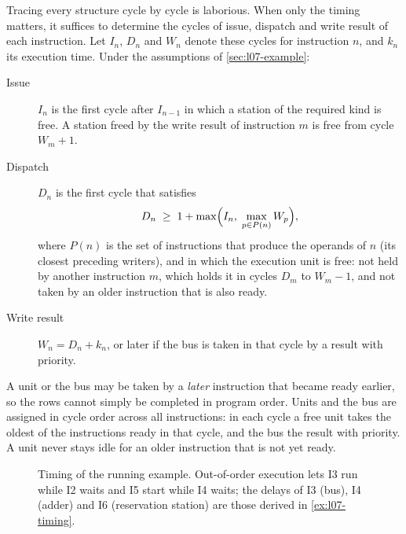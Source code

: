 \documentclass[../main.tex]{subfiles}
\begin{document}
Tracing every structure cycle by cycle is laborious.  When only the timing
matters, it suffices to determine the cycles of issue, dispatch and write
result of each instruction.  Let
$I_n$, $D_n$ and $W_n$ denote these cycles for instruction $n$, and $k_n$ its
execution time.  Under the assumptions of \cref{sec:l07-example}:
\begin{description}
  \item[Issue] $I_n$ is the first cycle after $I_{n-1}$ in which a station
    of the required kind is free.  A station freed by the write result of
    instruction $m$ is free from cycle $W_m+1$.
  \item[Dispatch] $D_n$ is the first cycle that satisfies
    \begin{equation}
      D_n \;\ge\; 1 + \max\Bigl(I_n,\; \max_{p \in P(n)} W_p\Bigr) ,
      \label{eq:l07-dispatch}
    \end{equation}
    where $P(n)$ is the set of instructions that produce the operands of $n$
    (its closest preceding writers), and in which the execution unit is
    free:
    not held by another instruction $m$, which holds it in cycles $D_m$ to
    $W_m - 1$, and not taken by an older instruction that is also ready.
  \item[Write result] $W_n = D_n + k_n$, or later if the bus is taken in that
    cycle by a result with priority.
\end{description}
A unit or the bus may be taken by a \emph{later} instruction that became ready
earlier, so the rows cannot simply be completed in program order.  Units and
the bus are assigned in cycle order across all instructions: in each cycle a
free unit takes the oldest of the instructions ready in that cycle, and the
bus the result with priority.  A unit never stays idle for an older
instruction that is not yet ready.

\begin{figure}[htbp]
  \centering
  
  \caption{Timing of the running example.  Out-of-order execution lets I3
    run while I2 waits and I5 start while I4 waits; the delays of I3 (bus),
    I4 (adder) and I6 (reservation station) are those derived in
    \cref{ex:l07-timing}.}
  \label{fig:l07-timing}
\end{figure}
\end{document}
